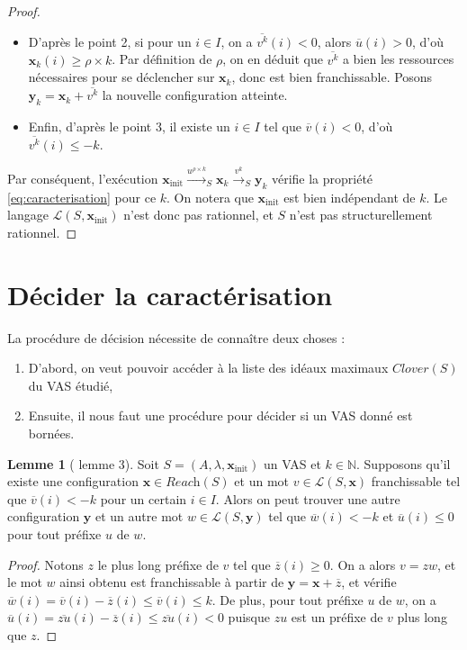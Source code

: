 \documentclass[a4paper,final]{article}
\theoremstyle{definition}
\newtheorem{Lemma}[Theorem]{Lemme}
\let\leq\leqslant
\let\geq\geqslant
\newcommand{\N}{\ensuremath{\mathbb{N}}}
\newcommand{\lang}{\ensuremath{\mathcal{L}}}
\newcommand{\reach}{\ensuremath{\textit{Reach}}}
\newcommand{\clover}{\textit{Clover}}
\newcommand{\trans}[2]{\ensuremath{\stackrel{#1}{\longrightarrow}_{#2}}}
\newcommand{\vect}[1]{\ensuremath{\mathbf{#1}}}
\newcommand{\xinit}{\ensuremath{\vect{x}_\text{init}}}
\newcommand{\valeur}[1]{\ensuremath{\overline{#1}}}
\begin{document}
\begin{proof}
\begin{itemize}
    \item D'après le point 2, si pour un $i\in I$, on a $\valeur{v^k}(i) < 0$, alors $\valeur{u}(i) > 0$, d'où $\vect{x}_k(i) \geq \rho\times k$.
    Par définition de $\rho$, on en déduit que $\valeur{v^k}$ a bien les ressources nécessaires pour se déclencher sur $\vect{x}_k$, donc est bien franchissable.
    Posons $\vect{y}_k = \vect{x}_k + \valeur{v^k}$ la nouvelle configuration atteinte.
    
    \item Enfin, d'après le point 3, il existe un $i\in I$ tel que $\valeur{v}(i) < 0$, d'où $\valeur{v^k}(i) \leq -k$.
\end{itemize}
Par conséquent, l'exécution $\xinit \trans{u^{\rho\times k}}{S} \vect{x}_k \trans{v^k}{S} \vect{y}_k$ vérifie la propriété \eqref{eq:caracterisation} pour ce $k$.
On notera que $\xinit$ est bien indépendant de $k$.
Le langage $\lang(S,\xinit)$ n'est donc pas rationnel, et $S$ n'est pas structurellement rationnel.
\end{proof}


\section{Décider la caractérisation}

La procédure de décision nécessite de connaître deux choses :
\begin{enumerate}
    \item D'abord, on veut pouvoir accéder à la liste des idéaux maximaux $\clover(S)$ du VAS étudié,
    \item Ensuite, il nous faut une procédure pour décider si un VAS donné est bornées.
\end{enumerate}

\begin{Lemma}[\cite{giyo80} lemme 3]\label{mot décroissant}
    Soit $S=(A,\lambda,\xinit)$ un VAS et $k\in\N$.
    Supposons qu'il existe une configuration $\vect{x}\in \reach(S)$ et un mot $v\in\lang(S,\vect{x})$ franchissable tel que $\valeur{v}(i) < -k$ pour un certain $i \in I$.
    Alors on peut trouver une autre configuration $\vect{y}$ et un autre mot $w\in\lang(S,\vect{y})$ tel que $\valeur{w}(i) < -k$ et $\valeur{u}(i) \leq 0$ pour tout préfixe $u$ de $w$.
\end{Lemma}

\begin{proof}
Notons $z$ le plus long préfixe de $v$ tel que $\valeur{z}(i) \geq 0$.
On a alors $v = zw$, et le mot $w$ ainsi obtenu est franchissable à partir de $\vect{y} = \vect{x} + \valeur{z}$, 
et vérifie $\valeur{w}(i) = \valeur{v}(i) - \valeur{z}(i) \leq \valeur{v}(i) \leq k$.
De plus, pour tout préfixe $u$ de $w$, on a $\valeur{u}(i) = \valeur{zu}(i) - \valeur{z}(i) \leq \valeur{zu}(i) < 0$ puisque $zu$ est un préfixe de $v$ plus long que $z$.
\end{proof}
\end{document}
